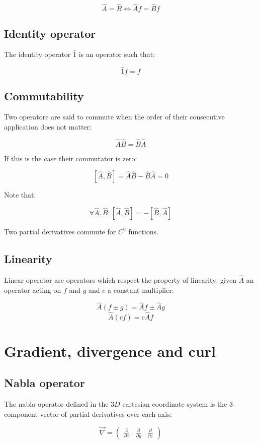 	$$\hat{A} = \hat{B} \Leftrightarrow \hat{A}f = \hat{B}f$$

	\subsection{Identity operator}
	The identity operator $\hat{1}$ is an operator such that:

	$$\hat{1}f = f$$

	\subsection{Commutability}
	Two operatore are said to commute when the order of their consecutive application does not matter:

	$$\hat{A}\hat{B} = \hat{B}\hat{A}$$

	If this is the case their commutator is zero:

	$$[\hat{A}, \hat{B}] = \hat{A}\hat{B}-\hat{B}\hat{A} = 0$$

	Note that:

	$$\forall \hat{A}, \hat{B}: [\hat{A}, \hat{B}] = -[\hat{B}, \hat{A}]$$

	Two partial derivatives commute for $C^2$ functions.

	\subsection{Linearity}
	Linear operator are operators which respect the property of linearity: given $\hat{A}$ an operator acting on $f$ and $g$ and $c$ a constant multiplier:

	$$\hat{A}(f\pm g) = \hat{A}f\pm \hat{A}g$$
	$$\hat{A}(cf) = c\hat{A}f$$
\section{Gradient, divergence and curl}

	\subsection{Nabla operator}
	The nabla operator defined in the $3D$ cartesian coordinate system is the $3$-component vector of partial derivatives over each axis:

	$$\vec{\nabla} = \begin{pmatrix} \frac{\partial}{\partial x} & \frac{\partial}{\partial y} & \frac{\partial}{\partial z}\end{pmatrix}$$

